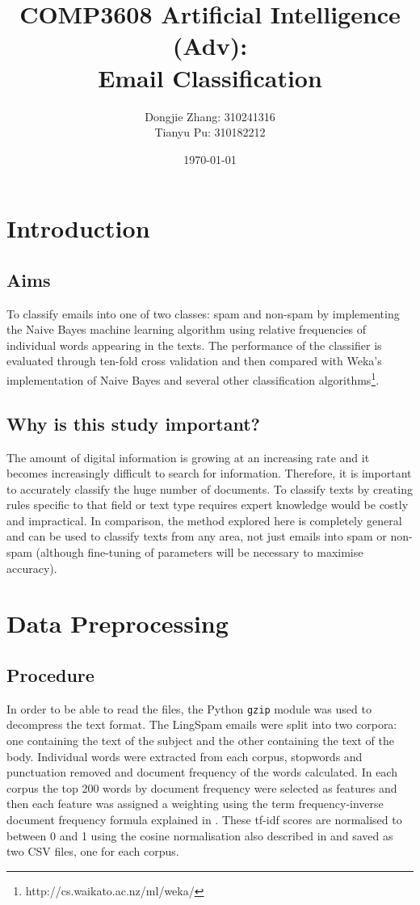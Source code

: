 \documentclass[12pt]{article}
\title{COMP3608 Artificial Intelligence (Adv): \\
Email Classification}
\author{Dongjie Zhang: 310241316 
\\ Tianyu Pu: 310182212}
\date{\today}
\begin{document}
\maketitle

\section{Introduction}
\subsection{Aims}
To classify emails into one of two classes: spam and non-spam by implementing the 
Naive Bayes machine learning algorithm using relative frequencies of individual 
words appearing in the texts. The performance of the classifier is evaluated through 
ten-fold cross validation and then compared with Weka's implementation of Naive Bayes 
and several other classification algorithms\footnote{http://cs.waikato.ac.nz/ml/weka/}.

\subsection{Why is this study important?}
The amount of digital information is growing at an increasing rate and it becomes 
increasingly difficult to search for information. Therefore, it is important to 
accurately classify the huge number of documents. To classify texts by creating 
rules specific to that field or text type requires expert knowledge would be costly 
and impractical. In comparison, the method explored here is completely general and 
can be used to classify texts from any area, not just emails into spam or non-spam 
(although fine-tuning of parameters will be necessary to maximise accuracy).

\section{Data Preprocessing}
\subsection{Procedure}
In order to be able to read the files, the Python \verb=gzip= module was used to
decompress the text format.
The LingSpam emails were split into two corpora: one containing the text of the 
subject and the other containing the text of the body. Individual words were extracted 
from each corpus, stopwords and punctuation removed and document frequency of 
the words calculated. In each corpus the top 200 words by document frequency were 
selected as features and then each feature was assigned a weighting using the
term frequency-inverse document frequency formula explained in \cite{sebastiani}.
These tf-idf scores are normalised to between 0 and 1 using the cosine normalisation
also described in \cite{sebastiani} and saved as two CSV files, one for each corpus.
\end{document}
